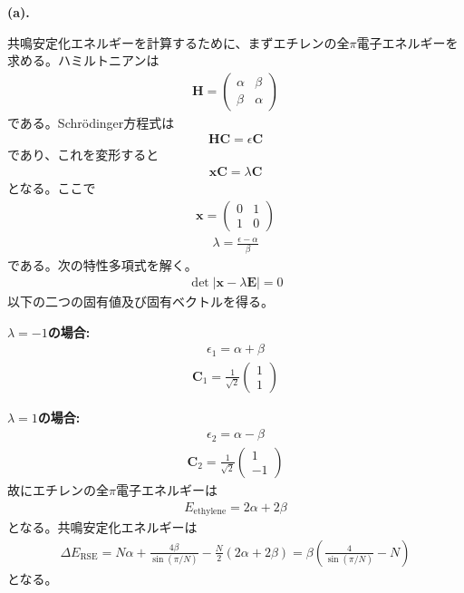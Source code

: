 \documentclass{jlreq}
\begin{document}
\noindent
\textbf{(a).} 

共鳴安定化エネルギーを計算するために、まずエチレンの全$\pi$電子エネルギーを求める。ハミルトニアンは
\begin{eqnarray}
    \mathbf{H}=
    \begin{pmatrix}
        \alpha & \beta \\
        \beta & \alpha
    \end{pmatrix}   
\end{eqnarray}  
である。Schr\"odinger方程式は
\begin{eqnarray}
    \mathbf{HC}=\epsilon\mathbf{C}
\end{eqnarray}  
であり、これを変形すると
\begin{eqnarray}
    \mathbf{xC}=\lambda\mathbf{C}
\end{eqnarray}
となる。ここで
\begin{eqnarray}
    \mathbf{x}=
    \begin{pmatrix}
        0 & 1 \\
        1 & 0
    \end{pmatrix}
\end{eqnarray}
\begin{eqnarray}
\lambda=\frac{\epsilon-\alpha}{\beta}
\end{eqnarray}  
である。次の特性多項式を解く。
\begin{eqnarray}
    \det|\mathbf{x}-\lambda\mathbf{E}|=0
\end{eqnarray}  
以下の二つの固有値及び固有ベクトルを得る。

\noindent
\textbf{$\lambda=-1$の場合:}\\
\begin{eqnarray}
    \epsilon_1=\alpha+\beta
\end{eqnarray}  
\begin{eqnarray}
    \mathbf{C}_1=\frac{1}{\sqrt{2}}
    \begin{pmatrix}
        1 \\
        1
    \end{pmatrix}   
\end{eqnarray}

\noindent   
\textbf{$\lambda=1$の場合:}\\ 
\begin{eqnarray}
    \epsilon_2=\alpha-\beta
\end{eqnarray}  
\begin{eqnarray}
    \mathbf{C}_2=\frac{1}{\sqrt{2}}
    \begin{pmatrix}
         1 \\
        -1
    \end{pmatrix}   
\end{eqnarray}
故にエチレンの全$\pi$電子エネルギーは
\begin{eqnarray}
    E_\text{ethylene}=2\alpha+2\beta
\end{eqnarray}  
となる。共鳴安定化エネルギーは
\begin{eqnarray}
    \Delta E_\text{RSE}=N\alpha+\frac{4\beta}{\sin(\pi/N)}-\frac{N}{2}\left(2\alpha+2\beta\right)=\beta\left(\frac{4}{\sin(\pi/N)}-N\right)
\end{eqnarray}
となる。
\end{document}
